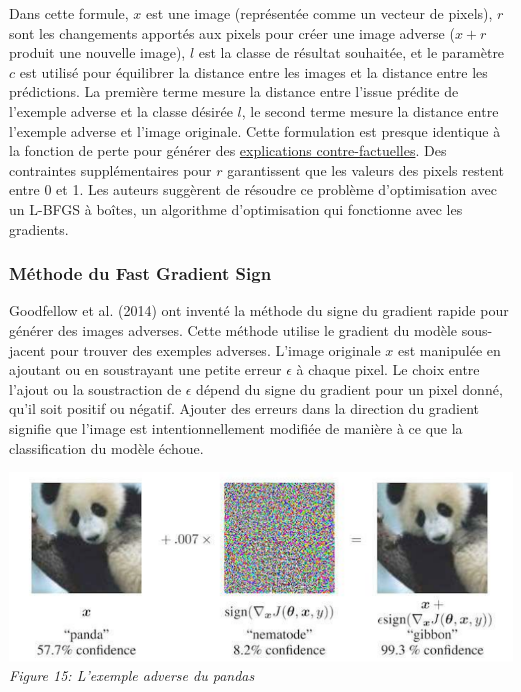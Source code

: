 Dans cette formule, \( x \) est une image (représentée comme un vecteur de pixels), \( r \) sont les changements apportés aux pixels pour créer une image adverse (\( x+r \) produit une nouvelle image), \( l \) est la classe de résultat souhaitée, et le paramètre \( c \) est utilisé pour équilibrer la distance entre les images et la distance entre les prédictions.
La première terme mesure la distance entre l'issue prédite de l'exemple adverse et la classe désirée \( l \), le second terme mesure la distance entre l'exemple adverse et l'image originale.
Cette formulation est presque identique à la fonction de perte pour générer des \hyperref[counterfactual]{explications contre-factuelles}.
Des contraintes supplémentaires pour \( r \) garantissent que les valeurs des pixels restent entre 0 et 1.
Les auteurs suggèrent de résoudre ce problème d'optimisation avec un L-BFGS à boîtes, un algorithme d'optimisation qui fonctionne avec les gradients.

\subsubsection{Méthode du Fast Gradient Sign}

Goodfellow et al. (2014) ont inventé la méthode du signe du gradient rapide pour générer des images adverses. Cette méthode utilise le gradient du modèle sous-jacent pour trouver des exemples adverses. L'image originale $x$ est manipulée en ajoutant ou en soustrayant une petite erreur $\epsilon$ à chaque pixel. Le choix entre l'ajout ou la soustraction de $\epsilon$ dépend du signe du gradient pour un pixel donné, qu'il soit positif ou négatif. Ajouter des erreurs dans la direction du gradient signifie que l'image est intentionnellement modifiée de manière à ce que la classification du modèle échoue.


\begin{center}
    \centering
    \includegraphics[width=0.7\linewidth]{Images/panda.png}
    \\
    \emph{Figure 15: L'exemple adverse du pandas}
    \\
\end{center}

